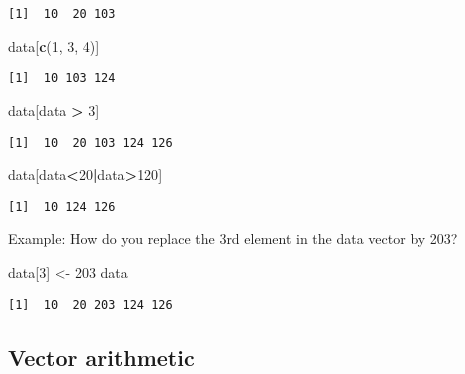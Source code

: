 \documentclass[
]{book}
\newenvironment{Shaded}{\begin{snugshade}}{\end{snugshade}}
\newcommand{\DecValTok}[1]{\textcolor[rgb]{0.00,0.00,0.81}{#1}}
\newcommand{\KeywordTok}[1]{\textcolor[rgb]{0.13,0.29,0.53}{\textbf{#1}}}
\newcommand{\NormalTok}[1]{#1}
\newcommand{\OperatorTok}[1]{\textcolor[rgb]{0.81,0.36,0.00}{\textbf{#1}}}
\newcommand{\StringTok}[1]{\textcolor[rgb]{0.31,0.60,0.02}{#1}}
\begin{document}
\begin{verbatim}
[1]  10  20 103
\end{verbatim}

\begin{Shaded}
\begin{Highlighting}[]
\NormalTok{data[}\KeywordTok{c}\NormalTok{(}\DecValTok{1}\NormalTok{, }\DecValTok{3}\NormalTok{, }\DecValTok{4}\NormalTok{)]}
\end{Highlighting}
\end{Shaded}

\begin{verbatim}
[1]  10 103 124
\end{verbatim}

\begin{Shaded}
\begin{Highlighting}[]
\NormalTok{data[data }\OperatorTok{>}\StringTok{ }\DecValTok{3}\NormalTok{]}
\end{Highlighting}
\end{Shaded}

\begin{verbatim}
[1]  10  20 103 124 126
\end{verbatim}

\begin{Shaded}
\begin{Highlighting}[]
\NormalTok{data[data}\OperatorTok{<}\DecValTok{20}\OperatorTok{|}\NormalTok{data}\OperatorTok{>}\DecValTok{120}\NormalTok{]}
\end{Highlighting}
\end{Shaded}

\begin{verbatim}
[1]  10 124 126
\end{verbatim}

Example: How do you replace the 3rd element in the data vector by 203?

\begin{Shaded}
\begin{Highlighting}[]
\NormalTok{data[}\DecValTok{3}\NormalTok{] <-}\StringTok{ }\DecValTok{203}
\NormalTok{data}
\end{Highlighting}
\end{Shaded}

\begin{verbatim}
[1]  10  20 203 124 126
\end{verbatim}

\hypertarget{vector-arithmetic}{%
\subsection{Vector arithmetic}\label{vector-arithmetic}}
\end{document}
